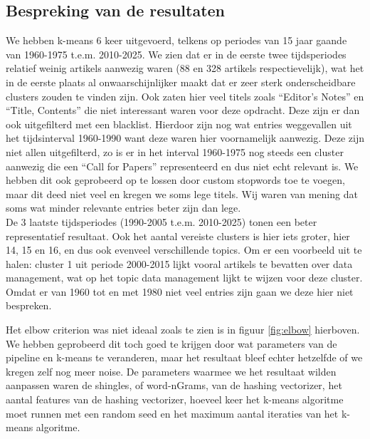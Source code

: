 \documentclass[a4paper,fontsize=11pt]{article}
\begin{document}
\subsection{Bespreking van de resultaten}
 
We hebben k-means 6 keer uitgevoerd, telkens op periodes van 15 jaar gaande van 1960-1975 t.e.m. 2010-2025. We zien dat er in de eerste twee tijdsperiodes relatief weinig artikels aanwezig waren (88 en 328 artikels respectievelijk), wat het in de eerste plaats al onwaarschijnlijker maakt dat er zeer sterk onderscheidbare clusters zouden te vinden zijn.
Ook zaten hier veel titels zoals ``Editor's Notes'' en ``Title, Contents'' die niet interessant waren voor deze opdracht.
Deze zijn er dan ook uitgefilterd met een blacklist. Hierdoor zijn nog wat entries weggevallen uit het tijdsinterval 1960-1990 want deze waren hier voornamelijk aanwezig.
Deze zijn niet allen uitgefilterd, zo is er in het interval 1960-1975 nog steeds een cluster aanwezig die een ``Call for Papers'' representeerd en dus niet echt relevant is.
We hebben dit ook geprobeerd op te lossen door custom stopwords toe te voegen, maar dit deed niet veel en kregen we soms lege titels.
Wij waren van mening dat soms wat minder relevante entries beter zijn dan lege. \\

De 3 laatste tijdsperiodes (1990-2005 t.e.m. 2010-2025) tonen een beter representatief resultaat.
Ook het aantal vereiste clusters is hier iets groter, hier 14, 15 en 16, en dus ook evenveel verschillende topics. Om er een voorbeeld uit te halen: cluster 1 uit periode 2000-2015 lijkt vooral artikels te bevatten over data management, wat op het topic data management lijkt te wijzen voor deze cluster. \\

Omdat er van 1960 tot en met 1980 niet veel entries zijn gaan we deze hier niet bespreken.

Het elbow criterion was niet ideaal zoals te zien is in figuur \ref{fig:elbow} hierboven. We hebben geprobeerd dit toch goed te krijgen door wat parameters van de pipeline en k-means te veranderen, maar het resultaat bleef echter hetzelfde of we kregen zelf nog meer noise. De parameters waarmee we het resultaat wilden aanpassen waren de shingles, of word-nGrams, van de hashing vectorizer, het aantal features van de hashing vectorizer, hoeveel keer het k-means algoritme moet runnen met een random seed en het maximum aantal iteraties van het k-means algoritme. \\
\end{document}
